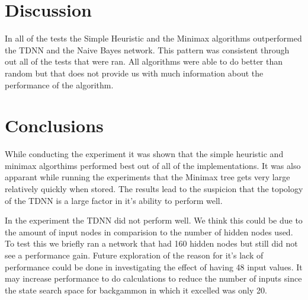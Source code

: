 \documentclass[12pt,letterpaper]{article}
\begin{document}
\section{Discussion}
In all of the tests the Simple Heuristic and the Minimax algorithms outperformed the TDNN and the Naive Bayes network. This pattern was consistent through out all of the tests that were ran. All algorithms were able to do better than random but that does not provide us with much information about the performance of the algorithm. 

\section{Conclusions}
While conducting the experiment it was shown that the simple heuristic and minimax algorthims performed best out of all of the implementations. It was also apparant while running the experiments that the Minimax tree gets very large relatively quickly when stored. The results lead to the suspicion that the topology of the TDNN is a large factor in it's ability to perform well.

In the experiment the TDNN did not perform well. We think this could be due to the amount of input nodes in comparision to the number of hidden nodes used. To test this we briefly ran a network that had 160 hidden nodes but still did not see a performance gain. Future exploration of the reason for it's lack of performance could be done in investigating the effect of having 48 input values. It may increase performance to do calculations to reduce the number of inputs since the state search space for backgammon in which it excelled was only 20. 



\newpage



\nocite{*}
\end{document}
